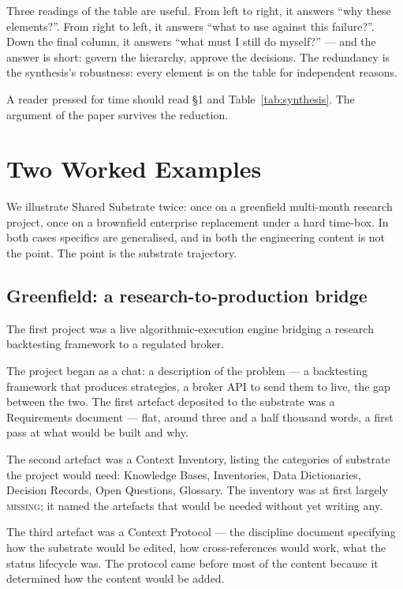 \documentclass[11pt,a4paper,twocolumn]{article}
\begin{document}
Three readings of the table are useful. From left to right, it
answers ``why these elements?''. From right to left, it answers
``what to use against this failure?''. Down the final column, it
answers ``what must I still do myself?'' --- and the answer is
short: govern the hierarchy, approve the decisions. The redundancy
is the synthesis's robustness: every element is on the table for
independent reasons.

A reader pressed for time should read \S1 and
Table~\ref{tab:synthesis}. The argument of the paper survives the
reduction.

\section{Two Worked Examples}
\label{sec:example}

We illustrate Shared Substrate twice: once on a greenfield
multi-month research project, once on a brownfield enterprise
replacement under a hard time-box. In both cases specifics are
generalised, and in both the engineering content is not the point.
The point is the substrate trajectory.

\subsection{Greenfield: a research-to-production bridge}

The first project was a live algorithmic-execution engine bridging
a research backtesting framework to a regulated broker.

The project began as a chat: a description of the
problem --- a backtesting framework that produces strategies, a broker
API to send them to live, the gap between the two. The first
artefact deposited to the substrate was a Requirements document ---
flat, around three and a half thousand words, a
first pass at what would be built and why.

The second artefact was a Context Inventory, listing the categories
of substrate the project would need: Knowledge Bases, Inventories,
Data Dictionaries, Decision Records, Open Questions, Glossary. The
inventory was at first largely \textsc{missing}; it named the
artefacts that would be needed without yet writing any.

The third artefact was a Context Protocol --- the discipline
document specifying how the substrate would be edited, how
cross-references would work, what the status lifecycle was. The
protocol came before most of the content because it determined how
the content would be added.
\end{document}
